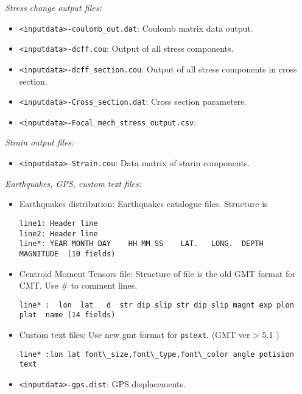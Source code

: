 \emph{Stress change output files:}

\begin{itemize}
\item
  \texttt{\textless{}inputdata\textgreater{}-coulomb\_out.dat}: Coulomb
  matrix data output.
\item
  \texttt{\textless{}inputdata\textgreater{}-dcff.cou}: Output of all
  stress components.
\item
  \texttt{\textless{}inputdata\textgreater{}-dcff\_section.cou}: Output
  of all stress components in cross section.
\item
  \texttt{\textless{}inputdata\textgreater{}-Cross\_section.dat}: Cross
  section parameters.
\item
  \texttt{\textless{}inputdata\textgreater{}-Focal\_mech\_stress\_output.csv}:
\end{itemize}

\emph{Strain output files:}

\begin{itemize}

\item
  \texttt{\textless{}inputdata\textgreater{}-Strain.cou}: Data matrix of
  starin components.
\end{itemize}

\emph{Earthquakes, GPS, custom text files:}

\begin{itemize}
\item
  Earthquakes distribution: Earthquakes catalogue files. Structure is

\begin{verbatim}
line1: Header line
line2: Header line
line*: YEAR MONTH DAY    HH MM SS    LAT.   LONG.  DEPTH    MAGNITUDE  (10 fields)
\end{verbatim}
\item
  Centroid Moment Tensors file: Structure of file is the old GMT format
  for CMT. Use \# to comment lines.

\begin{verbatim}
line* :  lon  lat   d  str dip slip str dip slip magnt exp plon  plat  name (14 fields)
\end{verbatim}
\item
  Custom text files: Use new gmt format for \texttt{pstext}. (GMT ver
  \textgreater{} 5.1 )

\begin{verbatim}
line* :lon lat font\_size,font\_type,font\_color angle potision text
\end{verbatim}
\item
  \texttt{\textless{}inputdata\textgreater{}-gps.dist}: GPS
  displacements.
\end{itemize}

